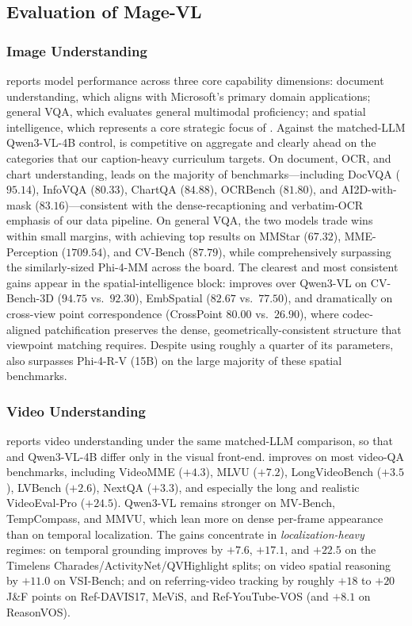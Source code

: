 \subsection{Evaluation of Mage-VL}
\label{sec:image_video_eval}
\subsubsection{Image Understanding}


 reports model performance across three core capability dimensions: document understanding, which aligns with Microsoft's primary domain applications; general VQA, which evaluates general multimodal proficiency; and spatial intelligence, which represents a core strategic focus of \magevl.
Against the matched-LLM Qwen3-VL-4B control, \magevl is competitive on aggregate and clearly ahead on the categories that our caption-heavy curriculum targets. On document, OCR, and chart understanding, \magevl leads on the majority of benchmarks---including DocVQA ($95.14$), InfoVQA ($80.33$), ChartQA ($84.88$), OCRBench ($81.80$), and AI2D-with-mask ($83.16$)---consistent with the dense-recaptioning and verbatim-OCR emphasis of our data pipeline. On general VQA, the two models trade wins within small margins, with \magevl achieving top results on MMStar ($67.32$), MME-Perception ($1709.54$), and CV-Bench ($87.79$), while comprehensively surpassing the similarly-sized Phi-4-MM across the board. The clearest and most consistent gains appear in the spatial-intelligence block: \magevl improves over Qwen3-VL on CV-Bench-3D ($94.75$ vs.\ $92.30$), EmbSpatial ($82.67$ vs.\ $77.50$), and dramatically on cross-view point correspondence (CrossPoint $80.00$ vs.\ $26.90$), where codec-aligned patchification preserves the dense, geometrically-consistent structure that viewpoint matching requires. Despite using roughly a quarter of its parameters, \magevl also surpasses Phi-4-R-V (15B) on the large majority of these spatial benchmarks. 

\subsubsection{Video Understanding}


 reports video understanding under the same matched-LLM comparison, so that \magevl and Qwen3-VL-4B differ only in the visual front-end.
\magevl improves on most video-QA benchmarks, including VideoMME ($+4.3$), MLVU ($+7.2$), LongVideoBench ($+3.5$), LVBench ($+2.6$), NextQA ($+3.3$), and especially the long and realistic VideoEval-Pro ($+24.5$). Qwen3-VL remains stronger on MV-Bench, TempCompass, and MMVU, which lean more on dense per-frame appearance than on temporal localization. The gains concentrate in \emph{localization-heavy} regimes: on temporal grounding \magevl improves by $+7.6$, $+17.1$, and $+22.5$ on the Timelens Charades/ActivityNet/QVHighlight splits; on video spatial reasoning by $+11.0$ on VSI-Bench; and on referring-video tracking by roughly $+18$ to $+20$ J\&F points on Ref-DAVIS17, MeViS, and Ref-YouTube-VOS (and $+8.1$ on ReasonVOS).
 
